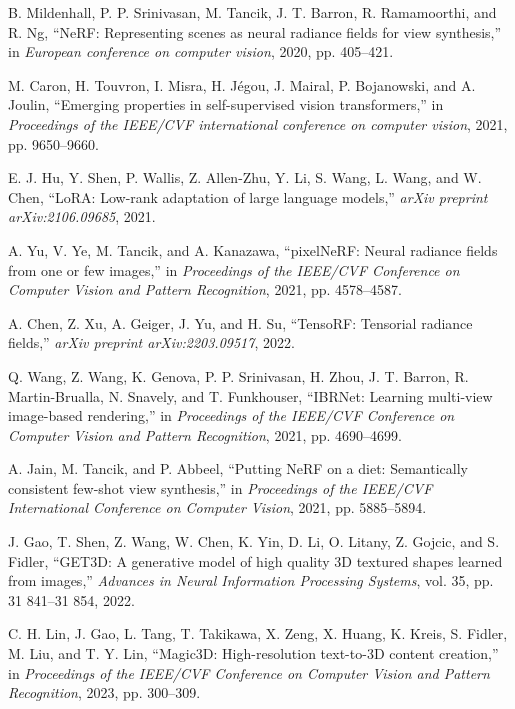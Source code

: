 \documentclass[11pt]{article}
\begin{document}

\begin{thebibliography}{99}

B. Mildenhall, P. P. Srinivasan, M. Tancik, J. T. Barron, R. Ramamoorthi, and R. Ng,
\newblock ``NeRF: Representing scenes as neural radiance fields for view synthesis,''
\newblock in \textit{European conference on computer vision}, 2020, pp. 405--421.

M. Caron, H. Touvron, I. Misra, H. Jégou, J. Mairal, P. Bojanowski, and A. Joulin,
\newblock ``Emerging properties in self-supervised vision transformers,''
\newblock in \textit{Proceedings of the IEEE/CVF international conference on computer vision}, 2021, pp. 9650--9660.

E. J. Hu, Y. Shen, P. Wallis, Z. Allen-Zhu, Y. Li, S. Wang, L. Wang, and W. Chen,
\newblock ``LoRA: Low-rank adaptation of large language models,''
\newblock \textit{arXiv preprint arXiv:2106.09685}, 2021.

A. Yu, V. Ye, M. Tancik, and A. Kanazawa,
\newblock ``pixelNeRF: Neural radiance fields from one or few images,''
\newblock in \textit{Proceedings of the IEEE/CVF Conference on Computer Vision and Pattern Recognition}, 2021, pp. 4578--4587.

A. Chen, Z. Xu, A. Geiger, J. Yu, and H. Su,
\newblock ``TensoRF: Tensorial radiance fields,''
\newblock \textit{arXiv preprint arXiv:2203.09517}, 2022.

Q. Wang, Z. Wang, K. Genova, P. P. Srinivasan, H. Zhou, J. T. Barron, R. Martin-Brualla, N. Snavely, and T. Funkhouser,
\newblock ``IBRNet: Learning multi-view image-based rendering,''
\newblock in \textit{Proceedings of the IEEE/CVF Conference on Computer Vision and Pattern Recognition}, 2021, pp. 4690--4699.

A. Jain, M. Tancik, and P. Abbeel,
\newblock ``Putting NeRF on a diet: Semantically consistent few-shot view synthesis,''
\newblock in \textit{Proceedings of the IEEE/CVF International Conference on Computer Vision}, 2021, pp. 5885--5894.

J. Gao, T. Shen, Z. Wang, W. Chen, K. Yin, D. Li, O. Litany, Z. Gojcic, and S. Fidler,
\newblock ``GET3D: A generative model of high quality 3D textured shapes learned from images,''
\newblock \textit{Advances in Neural Information Processing Systems}, vol. 35, pp. 31 841--31 854, 2022.

C. H. Lin, J. Gao, L. Tang, T. Takikawa, X. Zeng, X. Huang, K. Kreis, S. Fidler, M. Liu, and T. Y. Lin,
\newblock ``Magic3D: High-resolution text-to-3D content creation,''
\newblock in \textit{Proceedings of the IEEE/CVF Conference on Computer Vision and Pattern Recognition}, 2023, pp. 300--309.

\end{thebibliography}
\end{document}
